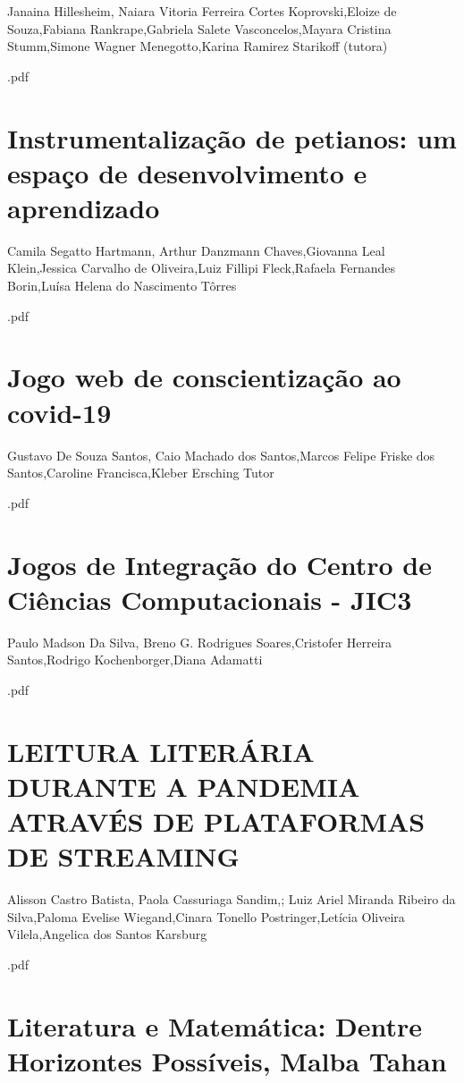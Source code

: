 Janaina Hillesheim, Naiara Vitoria Ferreira Cortes Koprovski,Eloize de Souza,Fabiana Rankrape,Gabriela Salete Vasconcelos,Mayara Cristina Stumm,Simone Wagner Menegotto,Karina Ramirez Starikoff (tutora)



.pdf\section{Instrumentalização de petianos: um espaço de desenvolvimento e aprendizado}

Camila Segatto Hartmann, Arthur Danzmann Chaves,Giovanna Leal Klein,Jessica Carvalho de Oliveira,Luiz Fillipi Fleck,Rafaela Fernandes Borin,Luísa Helena do Nascimento Tôrres



.pdf\section{Jogo web de conscientização ao covid-19}

Gustavo De Souza Santos, Caio Machado dos Santos,Marcos Felipe Friske dos Santos,Caroline Francisca,Kleber Ersching Tutor



.pdf\section{Jogos de Integração do Centro de Ciências Computacionais - JIC3}

Paulo Madson Da Silva, Breno G. Rodrigues Soares,Cristofer Herreira Santos,Rodrigo Kochenborger,Diana Adamatti



.pdf\section{LEITURA LITERÁRIA DURANTE A PANDEMIA ATRAVÉS DE PLATAFORMAS DE STREAMING}

Alisson Castro Batista, Paola Cassuriaga Sandim,; Luiz Ariel Miranda Ribeiro da  Silva,Paloma Evelise Wiegand,Cinara Tonello Postringer,Letícia Oliveira Vilela,Angelica dos Santos Karsburg



.pdf\section{Literatura e Matemática: Dentre Horizontes Possíveis, Malba Tahan}

